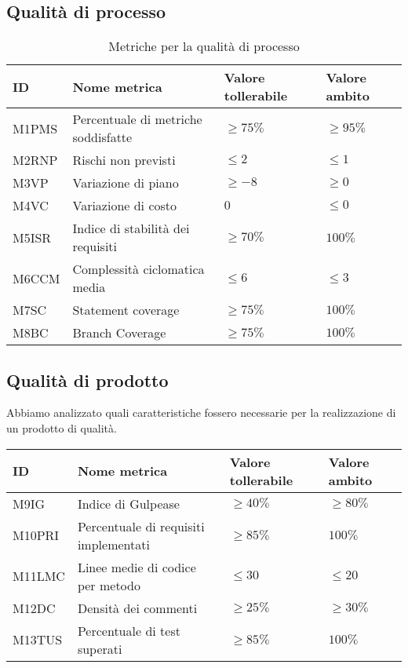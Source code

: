 \subsection{Qualità di processo}
 {\renewcommand{\arraystretch}{1.5}
 \begin{table}[H]
    \begin{tabularx}{\textwidth}{p{}|p{}|X|X}
    \textbf{ID} & \textbf{Nome metrica} & \textbf{Valore tollerabile} & \textbf{Valore ambito}  \\
    \hline
     M1PMS & Percentuale di metriche soddisfatte & $ \ge75\% $& $\ge95\% $\\
    \hline
     M2RNP & Rischi non previsti & $ \le2 $& $\le1 $\\
    \hline
     M3VP & Variazione di piano & $ \ge-8 $ & $ \ge0 $ \\
    \hline
     M4VC & Variazione di costo & $0$ & $\le0 $ \\
    \hline
     M5ISR &  Indice di stabilità dei requisiti & $ \ge70\% $ & $ 100\% $  \\
    \hline
     M6CCM & Complessità ciclomatica media & $\le6 $ & $\le3 $ \\
    \hline
    M7SC & Statement coverage & $ \ge75\% $ & $ 100\% $ \\
    
    \hline
     M8BC & Branch Coverage & $ \ge75\% $ & $ 100\% $ \\
    \end{tabularx}
    \caption{Metriche per la qualità di processo}
    \end{table}
    
\subsection{Qualità di prodotto}
Abbiamo analizzato quali caratteristiche fossero necessarie per la realizzazione di un prodotto di 
qualità.\\
 {\renewcommand{\arraystretch}{1.5}
 \begin{table}[H]
  \begin{tabularx}{\textwidth}{p{}|p{}|X|X}
    \textbf{ID} & \textbf{Nome metrica} & \textbf{Valore tollerabile} & \textbf{Valore ambito}  \\
    \hline
     M9IG & Indice di Gulpease & $ \ge40\% $& $\ge80\% $\\
    \hline
     M10PRI & Percentuale di requisiti implementati & $ \ge85\% $ & $ 100\% $ \\
    \hline
     M11LMC & Linee medie di codice per metodo & $\le30$ & $\le20$ \\
    \hline
    M12DC & Densità dei commenti & $\ge25\%$ & $\ge30\%$ \\
    \hline
M13TUS & Percentuale di test superati & $ \ge85\% $& $100\%$\\


\end{tabularx}
\end{table}}}
